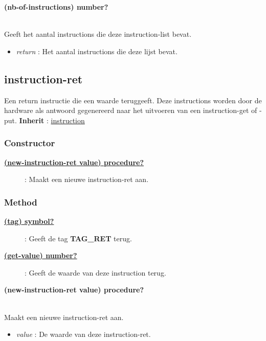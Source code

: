 \documentclass{article}
\newcommand{\ar}{\ding{213} }
\newcommand{\code}[1]{\textcolor{code}{#1}}
\newcommand{\lb}[1][]{\code{(#1}}
\newcommand{\rb}{\code{)}}
\newcommand{\racket}[1]{
	{\color{blue}\textbf{#1}}
}
\begin{document}
\begin{framed}
	\hypertarget{instruction-list:nb-of-instructions}{\racket{\lb[nb-of-instructions]\rb \ar \code{number?}}}
	\\Geeft het aantal instructions die deze instruction-list bevat.
	\begin{itemize}
		\item \emph{return} : Het aantal instructions die deze lijst bevat.
	\end{itemize}
\end{framed}

\newpage
\hypertarget{instruction-ret}{\subsection{instruction-ret}}
Een return instructie die een waarde teruggeeft. Deze instructions worden door de hardware als antwoord gegenereerd naar het uitvoeren van een instruction-get of -put.
\textbf{Inherit} : \hyperlink{instruction}{instruction}

\subsubsection{Constructor}
\begin{description}
	\item[\hyperlink{instruction-ret:new-instruction-ret}{\racket{\lb[new-instruction-ret] value\rb \ar \code{procedure?}}}] : Maakt een nieuwe instruction-ret aan.
\end{description}

\subsubsection{Method}
\begin{description}
	\item[\hyperlink{instruction-ret:tag}{\racket{\lb[tag]\rb \ar \code{symbol?}}}] : Geeft de tag \racket{TAG\_RET} terug.
	\item[\hyperlink{instruction-ret:get-value}{\racket{\lb[get-value]\rb \ar \code{number?}}}] : Geeft de waarde van deze instruction terug.
\end{description}

\begin{framed}
	\hypertarget{instruction-ret:new-instruction-ret}{\racket{\lb[new-instruction-ret] value\rb \ar \code{procedure?}}}
	\\Maakt een nieuwe instruction-ret aan.
	\begin{itemize}
		\item \emph{value} : De waarde van deze instruction-ret.
	\end{itemize}
\end{framed}
\end{document}
